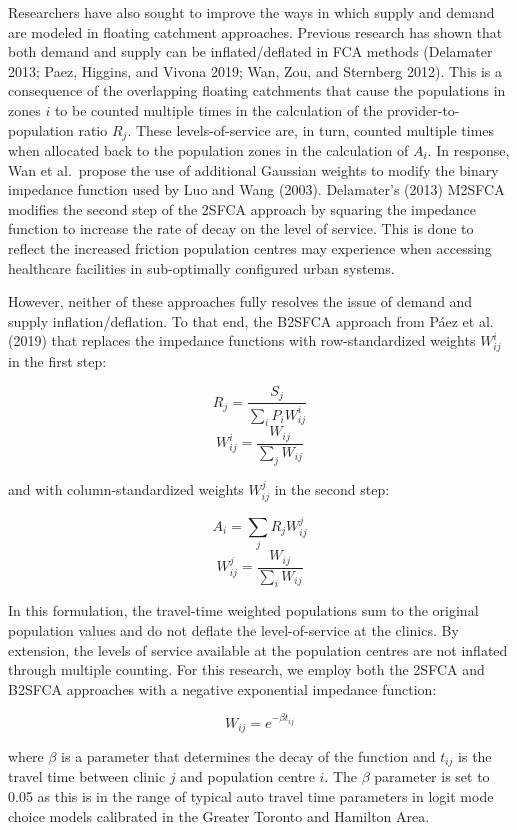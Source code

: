 \documentclass{article}
\begin{document}
Researchers have also sought to improve the ways in which supply and
demand are modeled in floating catchment approaches. Previous research
has shown that both demand and supply can be inflated/deflated in FCA
methods (Delamater 2013; Paez, Higgins, and Vivona 2019; Wan, Zou, and
Sternberg 2012). This is a consequence of the overlapping floating
catchments that cause the populations in zones \(i\) to be counted
multiple times in the calculation of the provider-to-population ratio
\(R_j\). These levels-of-service are, in turn, counted multiple times
when allocated back to the population zones in the calculation of
\(A_i\). In response, Wan et al.~propose the use of additional Gaussian
weights to modify the binary impedance function used by Luo and Wang
(2003). Delamater's (2013) M2SFCA modifies the second step of the 2SFCA
approach by squaring the impedance function to increase the rate of
decay on the level of service. This is done to reflect the increased
friction population centres may experience when accessing healthcare
facilities in sub-optimally configured urban systems.

However, neither of these approaches fully resolves the issue of demand
and supply inflation/deflation. To that end, the B2SFCA approach from
Páez et al. (2019) that replaces the impedance functions with
row-standardized weights \(W_{ij}^{i}\) in the first step:

\[
R_j = \frac{S_j}{\sum_i{P_iW_{ij}^{i}}}
\] \[
W_{ij}^{i} = \frac{W_{ij}}{\sum_j W_{ij}}
\]

and with column-standardized weights \(W_{ij}^{j}\) in the second step:

\[
A_i = \sum_j{R_jW_{ij}^{j}}
\] \[
W_{ij}^{j} = \frac{W_{ij}}{\sum_i W_{ij}}
\]

In this formulation, the travel-time weighted populations sum to the
original population values and do not deflate the level-of-service at
the clinics. By extension, the levels of service available at the
population centres are not inflated through multiple counting. For this
research, we employ both the 2SFCA and B2SFCA approaches with a negative
exponential impedance function:

\[
W_{ij} = e^{-\beta t_{ij}}
\]

where \(\beta\) is a parameter that determines the decay of the function
and \(t_{ij}\) is the travel time between clinic \(j\) and population
centre \(i\). The \(\beta\) parameter is set to 0.05 as this is in the
range of typical auto travel time parameters in logit mode choice models
calibrated in the Greater Toronto and Hamilton Area.
\end{document}
